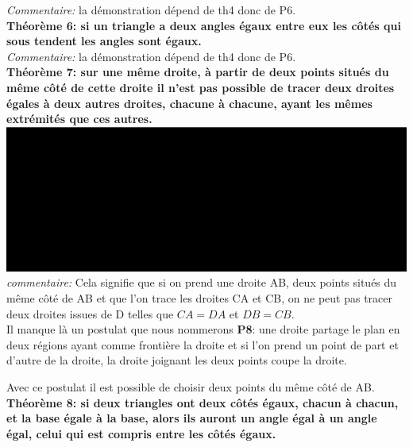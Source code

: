 \documentclass[a4paper, 12pt, twoside]{book}
\begin{document}
 \textit{Commentaire:} la démonstration dépend de th4 donc de P6.\\
 
 
  \textbf{Théorème 6: si un triangle a deux angles égaux entre eux les côtés qui sous tendent les angles sont égaux.}\\
  
  \textit{Commentaire:} la démonstration dépend de th4 donc de P6.\\
 
  
 \textbf{Théorème 7: sur une même droite,  à partir de deux points situés du même côté de cette droite il n'est pas possible de tracer deux droites égales à deux autres droites, chacune à chacune, ayant les mêmes extrémités que ces autres.}\\
 
 
 
 
  
 
 
    
 \includegraphics[scale=0.2]{figures/th7.eps} \\
 
 \textit{commentaire:} Cela signifie que si on prend une droite AB, deux points situés du même côté de AB et que l'on trace les droites CA et CB, on ne peut pas tracer deux droites issues de D telles que $CA=DA$ et $DB=CB$. \\
 
 Il manque là un postulat que nous nommerons \textbf{P8}: une droite partage le plan en deux régions ayant comme frontière la droite et si l'on prend un point de part et d'autre de la droite, la droite joignant les deux points coupe la droite.\
 
 Avec ce postulat il est possible de choisir deux points du même côté de AB.\\
 
 \textbf{Théorème 8: si deux triangles ont deux côtés égaux, chacun à chacun, et la base égale à la base, alors ils auront un angle égal à un angle égal, celui qui est compris entre les côtés égaux.}\\
 
\end{document}
